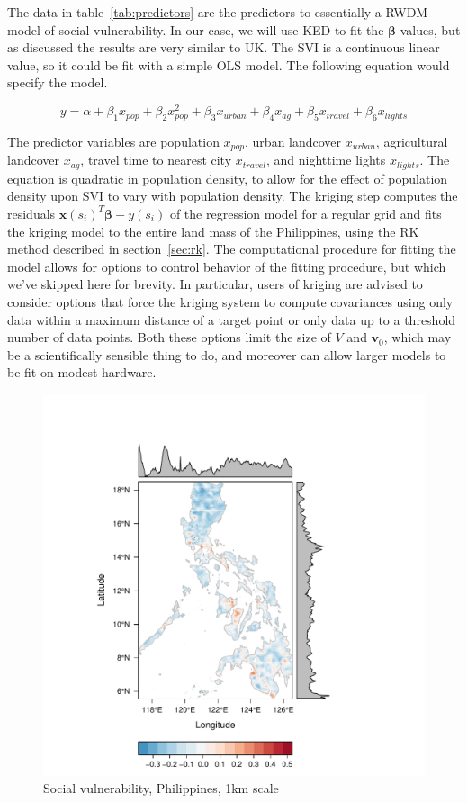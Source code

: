 \documentclass[]{interact}
\theoremstyle{plain}%
\theoremstyle{definition}
\theoremstyle{remark}
\begin{document}
The data in table~\ref{tab:predictors} are the predictors to essentially a RWDM model of social vulnerability.  In our case, we will use KED to fit the $\bm{\beta}$ values, but as discussed the results are very similar to UK.  The SVI is a continuous linear value, so it could be fit with a simple OLS model.  The following equation would specify the model.

\[y=\alpha+\beta_1x_{pop}+\beta_2x_{pop}^2+\beta_3x_{urban}+\beta_4x_{ag}+\beta_5x_{travel}+\beta_6x_{lights}\]

The predictor variables are population $x_{pop}$, urban landcover $x_{urban}$, agricultural landcover $x_{ag}$, travel time to nearest city $x_{travel}$, and nighttime lights $x_{lights}$.  The equation is quadratic in population density, to allow for the effect of population density upon SVI to vary with population density.  The kriging step computes the residuals $\bm{x}(s_i)^T \bm{\beta} - y(s_i)$ of the regression model for a regular grid and fits the kriging model to the entire land mass of the Philippines, using the RK method described in section~\ref{sec:rk}.  The computational procedure for fitting the model allows for options to control behavior of the fitting procedure, but which we've skipped here for brevity.  In particular, users of kriging are advised to consider options that force the kriging system to compute covariances using only data within a maximum distance of a target point or only data up to a threshold number of data points.  Both these options limit the size of $V$ and $\bm{v}_0$, which may be a scientifically sensible thing to do, and moreover can allow larger models to be fit on modest hardware.

\begin{figure}
  \centering
  \includegraphics[width=0.8\textheight]{svi.pdf}
  \caption{Social vulnerability, Philippines, 1km scale} \label{fig:svi}
\end{figure}
\end{document}
